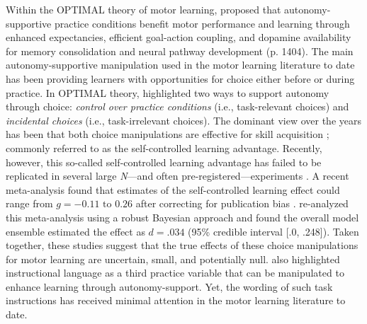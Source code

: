\documentclass[man,floatsintext,donotrepeattitle,letterpaper,12pt]{apa7}
\begin{document}
Within the OPTIMAL theory of motor learning, \textcite{wulf2016} proposed that autonomy-supportive practice conditions benefit motor performance and learning through enhanced expectancies, efficient goal-action coupling, and dopamine availability for memory consolidation and neural pathway development (p. 1404). The main autonomy-supportive manipulation used in the motor learning literature to date has been providing learners with opportunities for choice either before or during practice. In OPTIMAL theory, \textcite{wulf2016} highlighted two ways to support autonomy through choice: \emph{control over practice conditions} (i.e., task-relevant choices) and \emph{incidental choices} (i.e., task-irrelevant choices). The dominant view over the years has been that both choice manipulations are effective for skill acquisition \autocite[e.g.,][]{carter2014,carter2017,chiviacowsky2002,chiviacowsky2005,lewthwaite2015,wulf2014,wulf2018}; commonly referred to as the self-controlled learning advantage. Recently, however, this so-called self-controlled learning advantage has failed to be replicated in several large \emph{N}---and often pre-registered---experiments \autocite{bacelar2022,leiker2019,mckay2020,mckay2022,stgermain2022,stgermain2023,yantha2022}. A recent meta-analysis found that estimates of the self-controlled learning effect could range from $g = -0.11 \text{ to } 0.26$ after correcting for publication bias \autocite{mckay2022a}. \textcite{mckay2023} re-analyzed this meta-analysis using a robust Bayesian approach \autocite{bartos2023,maier2023} and found the overall model ensemble estimated the effect as $d = .034$ (95\% credible interval [.0, .248]). Taken together, these studies suggest that the true effects of these choice manipulations for motor learning are uncertain, small, and potentially null. \textcite{wulf2016} also highlighted instructional language as a third practice variable that can be manipulated to enhance learning through autonomy-support. Yet, the wording of such task instructions has received minimal attention in the motor learning literature to date.
\end{document}
